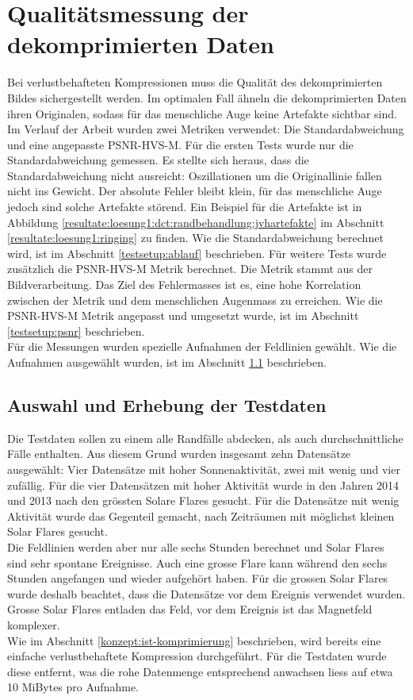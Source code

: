 \section{Qualitätsmessung der dekomprimierten Daten}
Bei verlustbehafteten Kompressionen muss die Qualität des dekomprimierten Bildes sichergestellt werden. Im optimalen Fall ähneln die dekomprimierten Daten ihren Originalen, sodass für das menschliche Auge keine Artefakte sichtbar sind.\\
Im Verlauf der Arbeit wurden zwei Metriken verwendet: Die Standardabweichung und eine angepasste PSNR-HVS-M. Für die ersten Tests wurde nur die Standardabweichung gemessen. Es stellte sich heraus, dass die Standardabweichung nicht ausreicht: Oszillationen um die Originallinie fallen nicht ins Gewicht. Der absolute Fehler bleibt klein, für das menschliche Auge jedoch sind solche Artefakte störend. Ein Beispiel für die Artefakte ist in Abbildung \ref{resultate:loesung1:dct:randbehandlung:jvhartefakte} im Abschnitt \ref{resultate:loesung1:ringing} zu finden. Wie die Standardabweichung berechnet wird, ist im Abschnitt \ref{testsetup:ablauf} beschrieben. Für weitere Tests wurde zusätzlich die PSNR-HVS-M Metrik berechnet. Die Metrik stammt aus der Bildverarbeitung. Das Ziel des Fehlermasses ist es, eine hohe Korrelation zwischen der Metrik und dem menschlichen Augenmass zu erreichen. Wie die PSNR-HVS-M Metrik angepasst und umgesetzt wurde, ist im Abschnitt \ref{testsetup:psnr} beschrieben.\\
Für die Messungen wurden spezielle Aufnahmen der Feldlinien gewählt. Wie die Aufnahmen ausgewählt wurden, ist im Abschnitt \ref{testsetup:auswahl_erhebung} beschrieben.

\subsection{Auswahl und Erhebung der Testdaten}\label{testsetup:auswahl_erhebung}
Die Testdaten sollen zu einem alle Randfälle abdecken, als auch durchschnittliche Fälle enthalten. Aus diesem Grund wurden insgesamt zehn Datensätze ausgewählt: Vier Datensätze mit hoher Sonnenaktivität, zwei mit wenig und vier zufällig. Für die vier Datensätzen mit hoher Aktivität wurde in den Jahren 2014 und 2013 nach den grössten Solare Flares gesucht. Für die Datensätze mit wenig Aktivität wurde das Gegenteil gemacht, nach Zeiträumen mit möglichst kleinen Solar Flares gesucht.\\
Die Feldlinien werden aber nur alle sechs Stunden berechnet und Solar Flares sind sehr spontane Ereignisse. Auch eine grosse Flare kann während den sechs Stunden angefangen und wieder aufgehört haben. Für die grossen Solar Flares wurde deshalb beachtet, dass die Datensätze vor dem Ereignis verwendet wurden. Grosse Solar Flares entladen das Feld, vor dem Ereignis ist das Magnetfeld komplexer.\\
[\baselineskip]
Wie im Abschnitt \ref{konzept:ist-komprimierung} beschrieben, wird bereits eine einfache verlustbehaftete Kompression durchgeführt. Für die Testdaten wurde diese entfernt, was die rohe Datenmenge entsprechend anwachsen liess auf etwa 10 MiBytes pro Aufnahme.

